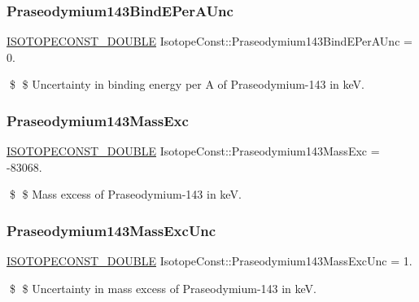 \subsubsection{\texorpdfstring{Praseodymium143\+Bind\+E\+Per\+A\+Unc}{Praseodymium143BindEPerAUnc}}
{\footnotesize\ttfamily \mbox{\hyperlink{group___isotope_const-_macros_ga8f45a7272ce02c0b4c65c44636ed719a}{I\+S\+O\+T\+O\+P\+E\+C\+O\+N\+S\+T\+\_\+\+D\+O\+U\+B\+LE}} Isotope\+Const\+::\+Praseodymium143\+Bind\+E\+Per\+A\+Unc = 0.}

\$ \$ Uncertainty in binding energy per A of Praseodymium-\/143 in keV. \mbox{\label{group___isotope_const-_praseodymium-_pr143_gaf2ab4fb5c658b458da0a58eb0b01cd7a}} 
\subsubsection{\texorpdfstring{Praseodymium143\+Mass\+Exc}{Praseodymium143MassExc}}
{\footnotesize\ttfamily \mbox{\hyperlink{group___isotope_const-_macros_ga8f45a7272ce02c0b4c65c44636ed719a}{I\+S\+O\+T\+O\+P\+E\+C\+O\+N\+S\+T\+\_\+\+D\+O\+U\+B\+LE}} Isotope\+Const\+::\+Praseodymium143\+Mass\+Exc = -\/83068.}

\$ \$ Mass excess of Praseodymium-\/143 in keV. \mbox{\label{group___isotope_const-_praseodymium-_pr143_ga43679aaf211759bbc4f3909269b0e7c1}} 
\subsubsection{\texorpdfstring{Praseodymium143\+Mass\+Exc\+Unc}{Praseodymium143MassExcUnc}}
{\footnotesize\ttfamily \mbox{\hyperlink{group___isotope_const-_macros_ga8f45a7272ce02c0b4c65c44636ed719a}{I\+S\+O\+T\+O\+P\+E\+C\+O\+N\+S\+T\+\_\+\+D\+O\+U\+B\+LE}} Isotope\+Const\+::\+Praseodymium143\+Mass\+Exc\+Unc = 1.}

\$ \$ Uncertainty in mass excess of Praseodymium-\/143 in keV. \mbox{\label{group___isotope_const-_praseodymium-_pr143_gaf810994cf882241f8cd4736ec8617868}} 
